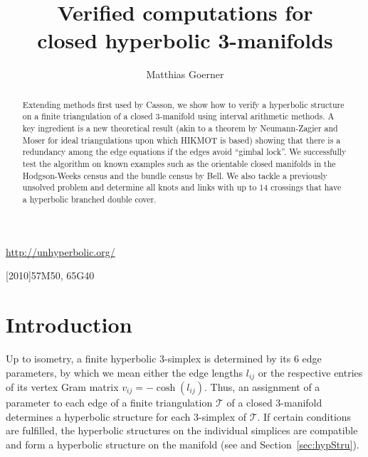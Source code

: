 \documentclass[utopia,fullpage]{nmd/article}
\newcommand{\negSpace}{\!}
\newcommand{\negSpace}{}
\newcommand{\urladdr}[1]{\url{#1}}
\newcommand{\subjclass}[1]{#1}
\newcommand\trig{\mathcal{T}}
\begin{document}
\title{Verified computations for\\ closed hyperbolic 3-manifolds}
\author{Matthias Goerner}
\urladdr{http://unhyperbolic.org/}

\subjclass[2010]{57M50, 65G40} 

\begin{abstract}
Extending methods first used by Casson, we show how to verify a hyperbolic structure on a finite triangulation of a closed 3-manifold using interval arithmetic methods. A key ingredient is a new theoretical result (akin to a theorem by Neumann-Zagier and Moser for ideal triangulations upon which HIKMOT is based) showing that there is a redundancy among the edge equations if the edges avoid ``gimbal lock''. We successfully test the algorithm on known examples such as the orientable closed manifolds in the Hodgson-Weeks census and the bundle census by Bell. We also tackle a previously unsolved problem and determine all knots and links with up to 14 crossings that have a hyperbolic branched double cover.
\end{abstract}

\maketitle

\setcounter{tocdepth}{1}

\tableofcontents

\section{Introduction}

Up to isometry, a finite hyperbolic 3-simplex is determined by its $6$ edge parameters, by which we mean either the edge lengths $l_{ij}$ or the respective entries of its vertex Gram matrix $v_{ij}=-\cosh(l_{ij})$. Thus, an assignment of a parameter to each edge of a finite triangulation $\trig$\negSpace{} of a closed 3-manifold determines a hyperbolic structure for each $3$-simplex of $\trig\negSpace{}$. If certain conditions are fulfilled, the hyperbolic structures on the individual simplices are compatible and form a hyperbolic structure on the manifold (see \cite{heardThesis} and Section~\ref{sec:hypStru}).
\end{document}
